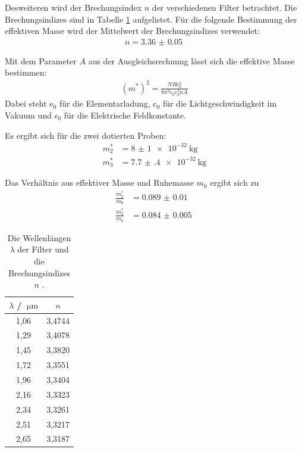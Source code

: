 Desweiteren wird der Brechungsindex $n$ der verschiedenen Filter betrachtet. Die Brechungsindizes sind in Tabelle \ref{tab:n} aufgelistet. Für die folgende Bestimmung der effektiven Masse wird der Mittelwert
der Brechungsindizes verwendet:
\begin{align}
  n = \SI{3.36(5)}{}
\end{align}

Mit dem Parameter $A$ aus der Ausgleichsrechnung lässt sich die effektive Masse bestimmen:
\begin{align}
  (m^*)^2 = \frac{NB\mathrm{e}_0^3}{8\pi^2\epsilon_0\mathrm{c}_0^3nA}
\end{align}
Dabei steht $\mathrm{e}_0$ für die Elementarladung, $\mathrm{c}_0$ für die Lichtgeschwindigkeit im Vakuum und
$\epsilon_0$ für die Elektrische Feldkonstante.

Es ergibt sich für die zwei dotierten Proben:
\begin{align}
  m^*_2 &= \SI{8(1)e-32}{\kilogram}\\
  m^*_3 &= \SI{7.7(4)e-32}{\kilogram}
\end{align}

Das Verhältnis aus effektiver Masse und Ruhemasse $m_0$ ergibt sich zu
\begin{align}
  \frac{m^*_2}{m_0} &= \SI{0.089(10)}{}\\
  \frac{m^*_3}{m_0} &= \SI{0.084(5)}{} 
\end{align}

\begin{table}
  \centering
  \begin{tabular}{c c}
    \toprule
    $\lambda$ / $\SI{}{\micro\metre}$ & $n$\\
    \midrule
        1,06  & 3,4744\\  
        1,29  & 3,4078\\  
        1,45  & 3,3820\\  
        1,72  & 3,3551\\  
        1,96  & 3,3404\\  
        2,16  & 3,3323\\  
        2,34  & 3,3261\\  
        2,51  & 3,3217\\  
        2,65  & 3,3187\\  
    \bottomrule
  \end{tabular}
  \caption{Die Wellenlängen $\lambda$ der Filter und die
  Brechungsindizes $n$ \cite{rii}.}
  \label{tab:n}
\end{table}

